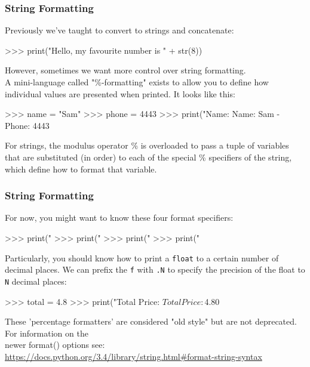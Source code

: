 \documentclass{beamer}
\begin{document}
\begin{frame}[fragile]
\frametitle{String Formatting}
Previously we've taught to convert to strings and concatenate:
\begin{code}
>>> print("Hello, my favourite number is " + str(8))
\end{code}

\vskip 0.3cm
However, sometimes we want more control over string formatting.\\
A mini-language called "\%-formatting" exists to allow you to define how individual
values are presented when printed.
It looks like this:

\begin{code}
>>> name = "Sam"
>>> phone = 4443
>>> print("Name: %
Name: Sam - Phone: 4443
\end{code}

For strings, the modulus operator \%
is overloaded to pass a tuple of variables that are substituted (in order)
to each of the
special \% specifiers of the string, which define how to format that variable.
\end{frame}


\begin{frame}[fragile]
\frametitle{String Formatting}
For now, you might want to know these four format specifiers:
\begin{code}
>>> print("%
>>> print("%
>>> print("%
>>> print("%
\end{code}

\vskip 0.3cm
Particularly, you should know how to print a \texttt{float} to a certain
    number of decimal places. We can prefix the \texttt{f} with \texttt{.N}
    to specify the precision of the float to \texttt{N} decimal places:
\begin{code}
>>> total = 4.8
>>> print("Total Price: $%
Total Price: $4.80
\end{code}

{\tiny{These 'percentage formatters' are considered "old style" but are not deprecated. For information on the\\\vskip -0.15cm newer format() options see: \url{https://docs.python.org/3.4/library/string.html#format-string-syntax}}}
\end{frame}
\end{document}
